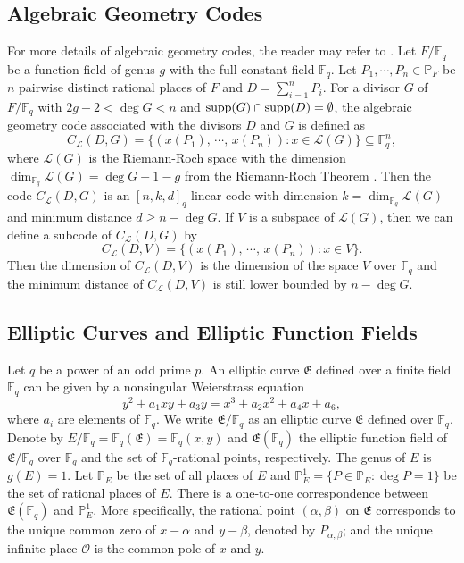 \documentclass[journal,12pt,onecolumn]{IEEEtran}
\begin{document}
\subsection{Algebraic Geometry Codes}
For more details of algebraic geometry codes, the reader may refer to \cite{Algebraic-Geometric_Codes}. Let $F/\mathbb{F}_q$ be a function field of genus $g$ with the full constant field $\mathbb{F}_q$. Let $P_1,\cdots,P_n\in\mathbb{P}_F$ be $n$ pairwise distinct rational places of $F$ and $D=\sum_{i=1}^nP_i$. For a divisor $G$ of $F/\mathbb{F}_q$ with $2g-2<\deg G<n$ and ${\rm{supp}}(G)\cap {\rm{supp}}(D)=\emptyset$, the algebraic geometry code associated with the divisors $D$ and $G$ is defined as
\[
    C_{\mathcal{L}}(D,G)=\big\{(x(P_1),\,\cdots,\,x(P_n)):x\in\mathcal{L}(G)\big\}\subseteq\mathbb{F}_q^n,
\]
where $\mathcal{L}(G)$ is the Riemann-Roch space with the dimension $\dim_{\mathbb{F}_q}\mathcal{L}(G)=\deg G+1-g$ from the Riemann-Roch Theorem \cite[Thm. 1.5.15]{Algebraic_Function_Fields_and_Codes}. Then the code $C_{\mathcal{L}}(D,G)$ is an $[n,k,d]_q$ linear code with dimension $k=\dim_{\mathbb{F}_q}\mathcal{L}(G)$ and minimum distance $d\ge n-\deg G$. If $V$ is a subspace of $\mathcal{L}(G)$, then we can define a subcode of $C_{\mathcal{L}}(D,G)$ by 
\[
    C_{\mathcal{L}}(D,V)=\big\{(x(P_1),\,\cdots,\,x(P_n)):x\in V\big\}.
\]
Then the dimension of $C_{\mathcal{L}}(D,V)$ is the dimension of the space $V$ over $\mathbb{F}_q$ and the minimum distance of $C_{\mathcal{L}}(D,V)$ is still lower bounded by $n-\deg G$.




\subsection{Elliptic Curves and Elliptic Function Fields}

Let $q$ be a power of an odd prime $p$. An elliptic curve \( \mathfrak{E} \) defined over a finite field \( \mathbb{F}_q \) can be given by a nonsingular Weierstrass equation
\begin{equation}\label{weierstrass}
    y^2 + a_1xy + a_3y = x^3 + a_2x^2 + a_4x + a_6,
\end{equation}
where \( a_i \) are elements of \( \mathbb{F}_q \). We write $\mathfrak{E}/\mathbb{F}_q$ as an elliptic curve $\mathfrak{E}$ defined over $\mathbb{F}_q$. Denote by $E/\mathbb{F}_q=\mathbb{F}_q(\mathfrak{E})=\mathbb{F}_q(x,y)$ and $\mathfrak{E}(\mathbb{F}_q)$ the elliptic function field of $\mathfrak{E}/\mathbb{F}_q$ over \(\mathbb{F}_q\) and the set of $\mathbb{F}_q$-rational points, respectively. The genus of \( E \) is \( g(E) = 1 \). Let $\mathbb{P}_E$ be the set of all places of $E$ and $\mathbb{P}_E^1=\{P\in\mathbb{P}_E:\deg P =1\}$ be the set of rational places of $E$. There is a one-to-one correspondence between $\mathfrak{E}(\mathbb{F}_q)$ and $\mathbb{P}_E^1$. More specifically, the rational point $(\alpha,\beta)$ on $\mathfrak{E}$ corresponds to the unique common zero of $x-\alpha$ and $y-\beta$, denoted by $P_{\alpha,\beta}$; and the unique infinite place \( \mathcal{O} \) is the common pole of \( x \) and \( y \).  
\end{document}
